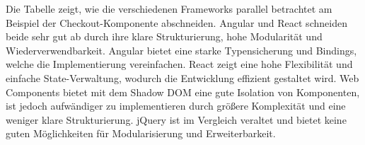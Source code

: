\documentclass[oneside]{ausarbeitung}
\begin{document}
\begin{table}[H]
\centering
\caption{Vergleich der Checkout-Komponenten}
\end{table}

Die Tabelle zeigt, wie die verschiedenen Frameworks parallel betrachtet am Beispiel der Checkout-Komponente abschneiden. Angular und React schneiden beide sehr gut ab durch ihre klare Strukturierung, hohe Modularität und Wiederverwendbarkeit. Angular bietet eine starke Typensicherung und Bindings, welche die Implementierung vereinfachen. React zeigt eine hohe Flexibilität und einfache State-Verwaltung, wodurch die Entwicklung effizient gestaltet wird. Web Components bietet mit dem Shadow DOM eine gute Isolation von Komponenten, ist jedoch aufwändiger zu implementieren durch größere Komplexität und eine weniger klare Strukturierung. jQuery ist im Vergleich veraltet und bietet keine guten Möglichkeiten für Modularisierung und Erweiterbarkeit.
\end{document}
